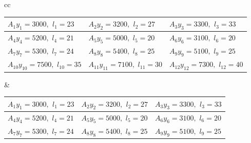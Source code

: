 \documentclass[conference]{IEEEtran}
\begin{document}
\begin{table}[htb] 
\scriptsize
\begin{tabular}{cc}
\begin{tabular}{|C{2.2cm}|C{2.2cm}|C{2.2cm}|}
\hline
$A_{1}$\newline$y_{1} = 3000,$ $l_{1} = 23$ & $A_{2}$\newline $y_{2} = 3200,$ $ l_{2} = 27$ & $A_{3}$\newline $y_{3} = 3300,$ $ l_{3} = 33$ \\
\hline
$A_{4}$\newline $y_{4} = 5200,$ $ l_{4} = 21$ & $A_{5}$\newline $y_{5} = 5000,$ $ l_{5} = 20$ & $A_{6}$\newline $y_{6} = 3100,$ $ l_{6} = 20$ \\
\hline
$A_{7}$\newline $y_{7} = 5300,$ $ l_{7} = 24$ & $A_{8}$\newline $y_{8} = 5400,$ $ l_{8} = 25$ & $A_{9}$\newline $y_{9} = 5100,$ $ l_{9} = 25$ \\
\hline
$A_{10}$\newline $y_{10} = 7500,$ $ l_{10} = 35$ & $A_{11}$\newline $y_{11} = 7100,$ $ l_{11} = 30$ & $A_{12}$\newline $y_{12} = 7300,$ $ l_{12} = 40$ \\
\hline
\end{tabular}
&
\begin{tabular}{|C{2.2cm}|C{2.2cm}|C{2.2cm}|}
\hline
$A_{1}$\newline $y_{1} = 3000,$ $l_{1} = 23$ & $A_{2}$\newline $y_{2} = 3200,$ $ l_{2} = 27$ & $A_{3}$\newline $y_{3} = 3300,$ $ l_{3} = 33$ \\
\hline
$A_{4}$\newline $y_{4} = 5200,$ $ l_{4} = 21$ & $A_{5}$\newline $y_{5} = 5000,$ $ l_{5} = 20$ & $A_{6}$\newline $y_{6} = 3100,$ $ l_{6} = 20$ \\
\hline
{}$A_{7}$\newline $y_{7} = 5300,$ $ l_{7} = 24$ & $A_{8}$\newline $y_{8} = 5400,$ $ l_{8} = 25$ & $A_{9}$\newline $y_{9} = 5100,$ $ l_{9} = 25$ \\

\end{tabular}
\end{tabular}
\end{table}
\end{document}
